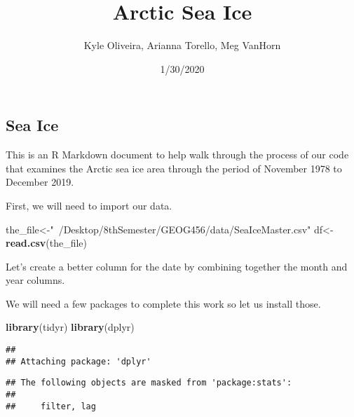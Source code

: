 \documentclass[]{article}
\title{Arctic Sea Ice}
\author{Kyle Oliveira, Arianna Torello, Meg VanHorn}
\date{1/30/2020}
\newenvironment{Shaded}{\begin{snugshade}}{\end{snugshade}}
\newcommand{\KeywordTok}[1]{\textcolor[rgb]{0.13,0.29,0.53}{\textbf{#1}}}
\newcommand{\StringTok}[1]{\textcolor[rgb]{0.31,0.60,0.02}{#1}}
\newcommand{\OperatorTok}[1]{\textcolor[rgb]{0.81,0.36,0.00}{\textbf{#1}}}
\newcommand{\NormalTok}[1]{#1}
\begin{document}
\maketitle

\subsection{Sea Ice}\label{sea-ice}

This is an R Markdown document to help walk through the process of our
code that examines the Arctic sea ice area through the period of
November 1978 to December 2019.

First, we will need to import our data.

\begin{Shaded}
\begin{Highlighting}[]
\NormalTok{the_file<-}\StringTok{"~/Desktop/8thSemester/GEOG456/data/SeaIceMaster.csv"}
\NormalTok{df<-}\KeywordTok{read.csv}\NormalTok{(the_file)}
\end{Highlighting}
\end{Shaded}

Let's create a better column for the date by combining together the
month and year columns.

\begin{Shaded}
\end{Shaded}

We will need a few packages to complete this work so let us install
those.

\begin{Shaded}
\begin{Highlighting}[]
\KeywordTok{library}\NormalTok{(tidyr)}
\KeywordTok{library}\NormalTok{(dplyr)}
\end{Highlighting}
\end{Shaded}

\begin{verbatim}
## 
## Attaching package: 'dplyr'
\end{verbatim}

\begin{verbatim}
## The following objects are masked from 'package:stats':
## 
##     filter, lag
\end{verbatim}
\end{document}
